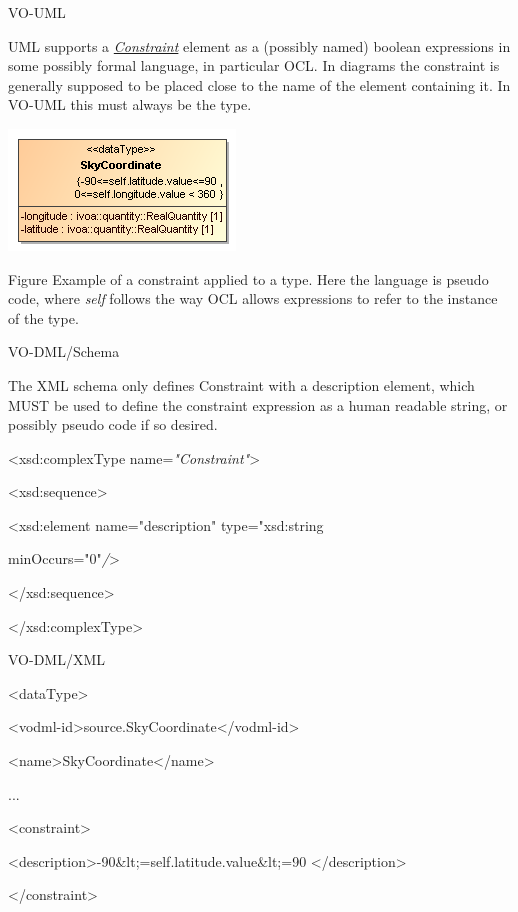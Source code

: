 \documentclass[10pt,a4paper]{ivoa}
\begin{document}
VO-UML

UML supports a
\href{http://www.uml-diagrams.org/constraint.html}{\emph{Constraint}}
element as a (possibly named) boolean expressions in some possibly
formal language, in particular OCL. In diagrams the constraint is
generally supposed to be placed close to the name of the element
containing it. In VO-UML this must always be the type.

\includegraphics[width=2.375in,height=1.27083in]{./media/image21.png}

Figure Example of a constraint applied to a type. Here the language is
pseudo code, where \emph{self} follows the way OCL allows expressions to
refer to the instance of the type.

VO-DML/Schema

The XML schema only defines Constraint with a description element, which
MUST be used to define the constraint expression as a human readable
string, or possibly pseudo code if so desired.

\textless xsd:complexType name=\emph{"Constraint"}\textgreater{}

\textless xsd:sequence\textgreater{}

\textless xsd:element name="description" type="xsd:string

minOccurs="0"\emph{/}\textgreater{}

\textless/xsd:sequence\textgreater{}

\textless/xsd:complexType\textgreater{}

VO-DML/XML

\textless dataType\textgreater{}

\textless vodml-id\textgreater source.SkyCoordinate\textless/vodml-id\textgreater{}

\textless name\textgreater SkyCoordinate\textless/name\textgreater{}

...

\textless constraint\textgreater{}

\textless description\textgreater-90\&lt;=self.latitude.value\&lt;=90
\textless/description\textgreater{}

\textless/constraint\textgreater{}
\end{document}
